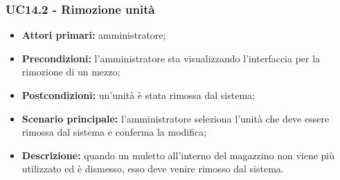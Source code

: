\subsubsection{UC14.2 - Rimozione unità}
\begin{itemize}
	\item 	\textbf{Attori primari:} amministratore;
	\item 	\textbf{Precondizioni:} l'amministratore sta visualizzando l'interfaccia per la rimozione di un mezzo;
	\item 	\textbf{Postcondizioni:} un'unità è stata rimossa dal sistema;
	\item 	\textbf{Scenario principale:} l'amministratore seleziona l'unità che deve essere rimossa dal sistema e conferma la modifica;
	\item 	\textbf{Descrizione:} quando un muletto all'interno del magazzino non viene più utilizzato ed è dismesso, esso deve venire rimosso dal sistema.
	
\end{itemize}
